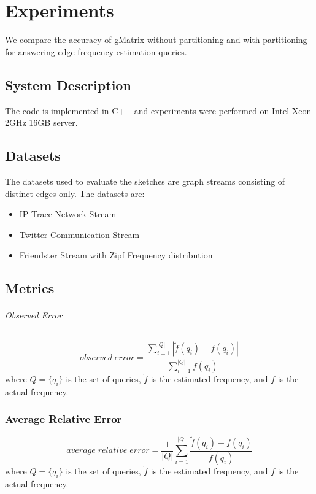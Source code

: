 \chapter{Experiments}

\ifpdf
    \graphicspath{{Chapter3/Figs/Raster/}{Chapter3/Figs/PDF/}{Chapter3/Figs/}}
\else
    \graphicspath{{Chapter3/Figs/Vector/}{Chapter3/Figs/}}
\fi

We compare the accuracy of gMatrix without partitioning and with partitioning for answering edge frequency estimation queries.

\section{System Description}
The code is implemented in C++ and experiments were performed on Intel Xeon 2GHz 16GB server.

\section{Datasets}
The datasets used to evaluate the sketches are graph streams consisting of distinct edges only. The datasets are:
\begin{itemize}
\item IP-Trace Network Stream \cite{khan}
\item Twitter Communication Stream \cite{khan}
\item Friendster Stream with Zipf Frequency distribution \cite{khan}
\end{itemize}

\section{Metrics}
\subparagraph{Observed Error \cite{khan}}
\[
observed\;error = \frac{ \sum_{i=1}^{|Q|}{|\tilde{f}(q_i) - f(q_i)|} }{\sum_{i=1}^{|Q|}f(q_i)}
\]
where $Q = \{q_i\}$ is the set of queries, $\tilde{f}$ is the estimated frequency, and $f$ is the actual frequency.

\subsection{Average Relative Error \cite{DBLP}}
\[
average\;relative\;error = \frac{1}{|Q|} \sum_{i=1}^{|Q|} \frac{\tilde{f}(q_i)-f(q_i)}{f(q_i)}
\]
where $Q = \{q_i\}$ is the set of queries, $\tilde{f}$ is the estimated frequency, and $f$ is the actual frequency.

